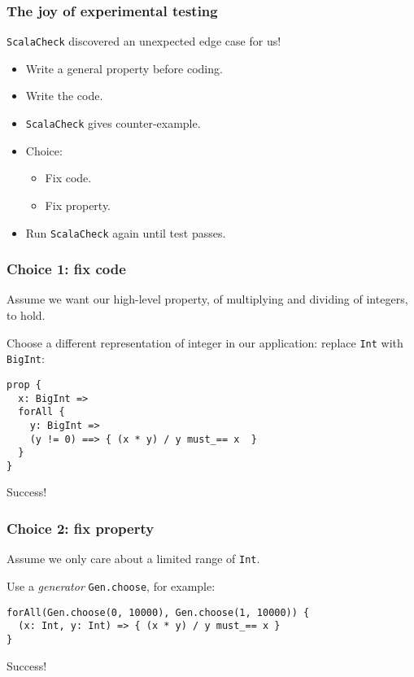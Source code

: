 \documentclass{beamer}
\begin{document}
\begin{frame}
  \frametitle{The joy of experimental testing}

  \texttt{ScalaCheck} discovered an unexpected edge case for us!

  \begin{itemize}
    \item<1-> Write a general property before coding.
    \item<2-> Write the code.
    \item<3-> \texttt{ScalaCheck} gives counter-example.
    \item<4-> Choice:
      \begin{itemize}
        \item<5-> Fix code.
        \item<5-> Fix property.
      \end{itemize}
    \item<6-> Run \texttt{ScalaCheck} again until test passes.
  \end{itemize}
\end{frame}

\begin{frame}[fragile]
  \frametitle{Choice 1: fix code}

  Assume we want our high-level property, of multiplying and dividing of integers, to hold.

  Choose a different representation of integer in our application: replace \texttt{Int} with \texttt{BigInt}:

  \begin{verbatim}
prop {
  x: BigInt =>
  forAll {
    y: BigInt =>
    (y != 0) ==> { (x * y) / y must_== x  }
  }
}
  \end{verbatim}

  Success!
\end{frame}

\begin{frame}[fragile]
  \frametitle{Choice 2: fix property}

  Assume we only care about a limited range of \texttt{Int}.

  Use a \emph{generator} \texttt{Gen.choose}, for example:

  \begin{verbatim}
forAll(Gen.choose(0, 10000), Gen.choose(1, 10000)) {
  (x: Int, y: Int) => { (x * y) / y must_== x }
}
  \end{verbatim}

  Success!
\end{frame}
\end{document}
